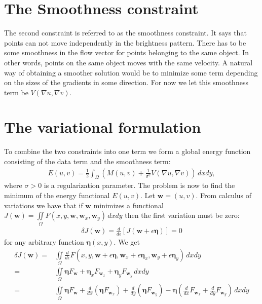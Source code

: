 \documentclass[10pt,a4paper]{article}
\begin{document}
\section{The Smoothness constraint}
The second constraint is referred to as the smoothness constraint. It says that points can not move independently in the brightness pattern. There has to be some smoothness in the flow vector for points belonging to the same object. In other words, points on the same object moves with the same velocity. A natural way of obtaining a smoother solution would be to minimize some term depending on the sizes of the gradients in some direction. For now we let this smoothness term be $V(\nabla u, \nabla v)$.

\section{The variational formulation}
To combine the two constraints into one term we form a global energy function consisting of the data term and the smoothness term:
\begin{align}
E(u,v) = \frac{1}{2} \int_\Omega (M(u,v) + \frac{1}{\sigma^2} V(\nabla u, \nabla v)) \, dx dy,
\end{align}
where $\sigma > 0$ is a regularization parameter. The problem is now to find the minimum of the energy functional $E(u,v)$. Let $\textbf{w} = (u,v)$. From calculus of variations we have that if $\textbf{w}$ minimizes a functional $J(\textbf{w}) = \iint \limits_\Omega F(x,y,\textbf{w},\textbf{w}_x,\textbf{w}_y) \, dxdy$ then the first variation must be zero:
\begin{align*}
\delta J(\textbf{w}) = \frac{d}{d \epsilon} \left[ J(\textbf{w} + \epsilon \bm{\eta}) \right] = 0 
\end{align*}
for any arbitrary function $\bm{\eta}(x,y)$. We get
\begin{align*}
\delta J(\textbf{w}) =&  \iint \limits_{\Omega} \frac{d}{d \epsilon} F(x,y,\textbf{w} + \epsilon \bm{\eta}, \textbf{w}_x + \epsilon \bm{\eta}_x, \textbf{w}_y + \epsilon \bm{\eta}_y) \, dxdy \\
=&  \iint \limits_{\Omega} \bm{\eta} F_\textbf{w} + \bm{\eta}_x F_{\textbf{w}_x} + \bm{\eta}_y F_{\textbf{w}_y} \, dxdy \\
=& \iint \limits_{\Omega} \bm{\eta} F_\textbf{w} + \frac{d}{d x} (\bm{\eta} F_{\textbf{w}_x}) + \frac{d }{d y} (\bm{\eta} F_{\textbf{w}_y}) - \bm{\eta} \left( \frac{d}{d x} F_{\textbf{w}_x} + \frac{d }{d y} F_{\textbf{w}_y} \right) \, dxdy
\end{align*}
\end{document}
